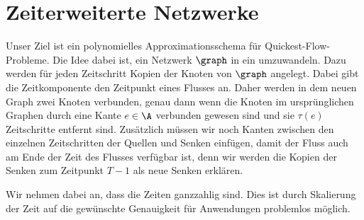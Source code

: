 \section{Zeiterweiterte Netzwerke}

Unser Ziel ist ein polynomielles Approximationsschema für Quickest-Flow-Probleme.
Die Idee dabei ist, ein Netzwerk $\graph$ in ein 
umzuwandeln. Dazu werden für jeden Zeitschritt Kopien der Knoten von $\graph$
angelegt. Dabei gibt die Zeitkomponente den Zeitpunkt eines Flusses an. Daher
werden in dem neuen Graph zwei Knoten verbunden, genau dann wenn die Knoten
im ursprünglichen Graphen durch eine Kante $e \in \A$ verbunden gewesen sind und
sie $\tau(e)$ Zeitschritte entfernt sind. Zusätzlich müssen wir noch Kanten
zwischen den einzelnen Zeitschritten der Quellen und Senken einfügen, damit
der Fluss auch am Ende der Zeit des Flusses verfügbar ist, denn wir werden
die Kopien der Senken zum Zeitpunkt $T-1$ als neue Senken erklären.

Wir nehmen dabei an, dass die Zeiten ganzzahlig sind. Dies ist durch Skalierung
der Zeit auf die gewünschte Genauigkeit für Anwendungen problemlos möglich.

